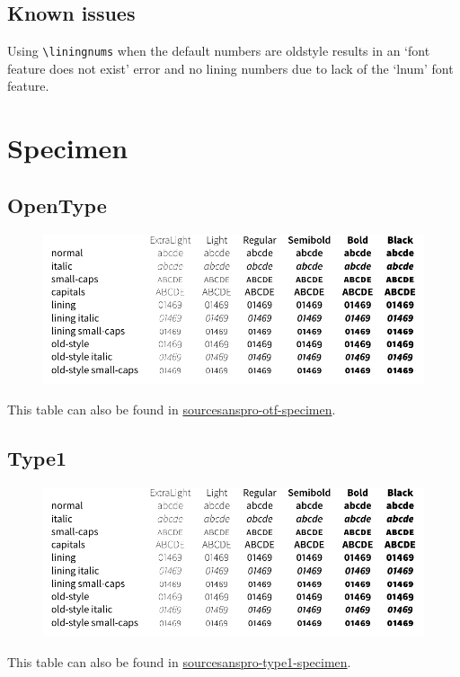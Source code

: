 \documentclass[11pt,a4paper,english]{article}
\newcommand*\file[1]{\href{run:#1.pdf}{#1}}
\begin{document}
\begin{multicols}{2}
\section{Known issues}
\begin{itemize*}
	\item Using \texttt{\textbackslash liningnums} when the default numbers are oldstyle results in an ‘font feature does not exist’ error and no lining numbers due to lack of the ‘lnum’ font feature.
\end{itemize*}

\newpage
\end{multicols}

\section{Specimen}
\label{sec:specimen}
\subsection{OpenType}
\begin{figure}[ht]
	\centering
	\includegraphics{sourcesanspro-otf-specimen}
\end{figure}
This table can also be found in \file{sourcesanspro-otf-specimen}.

\subsection{Type1}
\begin{figure}[ht]
	\centering
	\includegraphics{sourcesanspro-type1-specimen}
\end{figure}
This table can also be found in \file{sourcesanspro-type1-specimen}.
\end{document}

